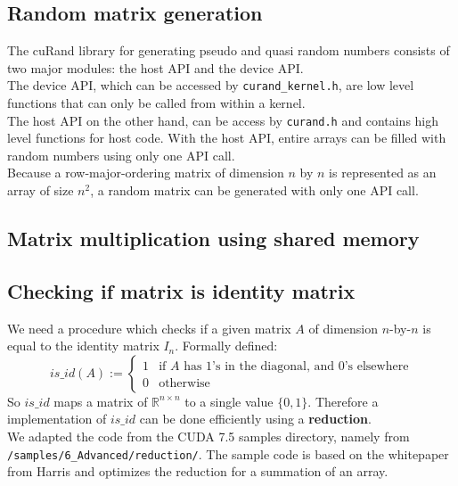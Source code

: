 \subsection*{Random matrix generation}
The cuRand library for generating pseudo and quasi random numbers consists of two major modules:
the host API and the device API.\\
The device API, which can be accessed by \texttt{curand\_kernel.h}, are low level functions that can only be called from within a kernel. \\
The host API on the other hand, can be access by \texttt{curand.h} and contains high level functions for host code. With the host API, entire arrays can be filled with random numbers using only one API call. \\
Because a row-major-ordering matrix of dimension $n$ by $n$ is represented as an array of size $n^2$, a random matrix can be generated with only one API call. 

\subsection*{Matrix multiplication using shared memory}

\subsection*{Checking if matrix is identity matrix}
We need a procedure which checks if a given matrix $A$ of dimension $n$-by-$n$ is equal to the identity matrix $I_n$. Formally defined:
\begin{equation*}
is\_id(A) := \begin{cases}
1 & \text{if } A \text{ has 1's in the diagonal, and 0's elsewhere}\\
0 & \text{otherwise}
\end{cases}
\end{equation*}
So $is\_id$ maps a matrix of $\mathbb{R}^{n \times n}$ to a single value $\{0,1 \}$. Therefore a implementation of $is\_id$ can be done efficiently using a \textbf{reduction}.  \\
We adapted the code from the CUDA 7.5 samples directory, namely from \texttt{/samples/6\_Advanced/reduction/}. The sample code is based on the whitepaper from Harris \cite{Harris2010} and optimizes the reduction for a summation of an array.